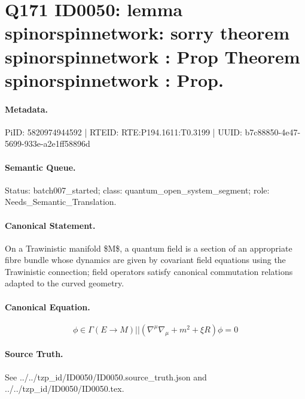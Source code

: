 \section*{Q171 ID0050: lemma spinorspinnetwork: sorry theorem spinorspinnetwork : Prop Theorem spinorspinnetwork : Prop.}
\paragraph{Metadata.}
PiID: 5820974944592 | RTEID: RTE:P194.1611:T0.3199 | UUID: b7c88850-4e47-5699-933e-a2e1ff58896d

\paragraph{Semantic Queue.}
Status: batch007\_started; class: quantum\_open\_system\_segment; role: Needs\_Semantic\_Translation.

\paragraph{Canonical Statement.}
On a Trawinistic manifold \$M\$, a quantum field is a section of an appropriate fibre bundle whose dynamics are given by covariant field equations using the Trawinistic connection; field operators satisfy canonical commutation relations adapted to the curved geometry.

\paragraph{Canonical Equation.}
\[
\phi \in \Gamma(E \to M) || \left(\nabla^{\mu}\nabla_{\mu} + m^{2} + \xi R\right)\phi = 0
\]

\paragraph{Source Truth.}
See ../../tzp\_id/ID0050/ID0050.source\_truth.json and ../../tzp\_id/ID0050/ID0050.tex.
